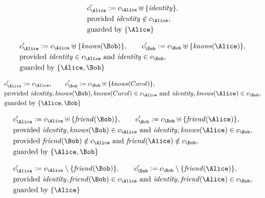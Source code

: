 \begin{align*}
&
c'_
{
\Alice
}
 := 
c_
{
\Alice
}
 \uplus 
\{
\mathit{
identity
}
\}
,\\
&
\text{provided } 
\mathit{
identity
}
 \notin c_
{
\Alice
}
,\\
&
\text{guarded by } \{
\Alice
\}
\end{align*}

\begin{align*}
&
c'_
{
\Alice
}
 := 
c_
{
\Alice
}
 \uplus 
\{
\mathit{
knows
}
(
\Bob
)
\}
, \qquad 
c'_
{
\Bob
}
 := 
c_
{
\Bob
}
 \uplus 
\{
\mathit{
knows
}
(
\Alice
)
\}
,\\
&
\text{provided } 
\mathit{
identity
}
 \in c_
{
\Alice
}
 \text{ and } 
\mathit{
identity
}
 \in c_
{
\Bob
}
,\\
&
\text{guarded by } \{
\Alice
,
\Bob
\}
\end{align*}

\begin{align*}
&
c'_
{
\Alice
}
 := 
c_
{
\Alice
}
, \qquad 
c'_
{
\Bob
}
 := 
c_
{
\Bob
}
 \uplus 
\{
\mathit{
knows
}
(
Carol
)
\}
,\\
&
\text{provided } 
\mathit{
identity
}
,
\mathit{
knows
}
(
\Bob
)
,
\mathit{
knows
}
(
Carol
)
 \in c_
{
\Alice
}
 \text{ and } 
\mathit{
identity
}
,
\mathit{
knows
}
(
\Alice
)
 \in c_
{
\Bob
}
,\\
&
\text{guarded by } \{
\Alice
,
\Bob
\}
\end{align*}

\begin{align*}
&
c'_
{
\Alice
}
 := 
c_
{
\Alice
}
 \uplus 
\{
\mathit{
friend
}
(
\Bob
)
\}
, \qquad 
c'_
{
\Bob
}
 := 
c_
{
\Bob
}
 \uplus 
\{
\mathit{
friend
}
(
\Alice
)
\}
,\\
&
\text{provided } 
\mathit{
identity
}
,
\mathit{
knows
}
(
\Bob
)
 \in c_
{
\Alice
}
 \text{ and } 
\mathit{
identity
}
,
\mathit{
knows
}
(
\Alice
)
 \in c_
{
\Bob
}
,\\
&
\text{provided } 
\mathit{
friend
}
(
\Bob
)
 \notin c_
{
\Alice
}
 \text{ and } 
\mathit{
friend
}
(
\Alice
)
 \notin c_
{
\Bob
}
,\\
&
\text{guarded by } \{
\Alice
,
\Bob
\}
\end{align*}

\begin{align*}
&
c'_
{
\Alice
}
 := 
c_
{
\Alice
}
 \setminus 
\{
\mathit{
friend
}
(
\Bob
)
\}
, \qquad 
c'_
{
\Bob
}
 := 
c_
{
\Bob
}
 \setminus 
\{
\mathit{
friend
}
(
\Alice
)
\}
,\\
&
\text{provided } 
\mathit{
identity
}
,
\mathit{
friend
}
(
\Bob
)
 \in c_
{
\Alice
}
 \text{ and } 
\mathit{
identity
}
,
\mathit{
friend
}
(
\Alice
)
 \in c_
{
\Bob
}
,\\
&
\text{guarded by } \{
\Alice
\}
\end{align*}
